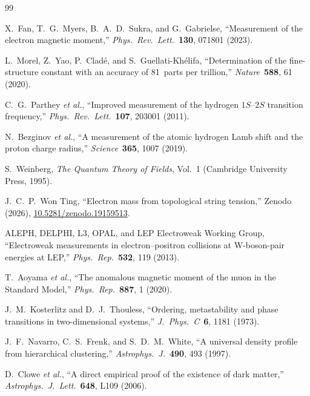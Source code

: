 ﻿\documentclass[a4paper,12pt]{article}
\begin{document}
\begin{thebibliography}{99}

  X.~Fan, T.~G.~Myers, B.~A.~D.~Sukra, and G.~Gabrielse,
  ``Measurement of the electron magnetic moment,''
  \emph{Phys.\ Rev.\ Lett.}\ \textbf{130}, 071801 (2023).

  L.~Morel, Z.~Yao, P.~Clad\'e, and S.~Guellati-Kh\'elifa,
  ``Determination of the fine-structure constant with an accuracy of
  81~parts per trillion,''
  \emph{Nature}\ \textbf{588}, 61 (2020).

  C.~G.~Parthey \emph{et al.},
  ``Improved measurement of the hydrogen $1S$--$2S$ transition
  frequency,''
  \emph{Phys.\ Rev.\ Lett.}\ \textbf{107}, 203001 (2011).

  N.~Bezginov \emph{et al.},
  ``A measurement of the atomic hydrogen Lamb shift and the proton
  charge radius,''
  \emph{Science}\ \textbf{365}, 1007 (2019).

  S.~Weinberg,
  \emph{The Quantum Theory of Fields}, Vol.~1
  (Cambridge University Press, 1995).

  J.~C.~P.~Won Ting,
  ``Electron mass from topological string tension,''
  Zenodo (2026), \href{https://doi.org/10.5281/zenodo.19159513}{10.5281/zenodo.19159513}.

  ALEPH, DELPHI, L3, OPAL, and LEP Electroweak Working Group,
  ``Electroweak measurements in electron--positron collisions at
  W-boson-pair energies at LEP,''
  \emph{Phys.\ Rep.}\ \textbf{532}, 119 (2013).

  T.~Aoyama \emph{et al.},
  ``The anomalous magnetic moment of the muon in the Standard Model,''
  \emph{Phys.\ Rep.}\ \textbf{887}, 1 (2020).

  J.~M.~Kosterlitz and D.~J.~Thouless,
  ``Ordering, metastability and phase transitions in two-dimensional
  systems,''
  \emph{J.\ Phys.\ C}\ \textbf{6}, 1181 (1973).

  J.~F.~Navarro, C.~S.~Frenk, and S.~D.~M.~White,
  ``A universal density profile from hierarchical clustering,''
  \emph{Astrophys.\ J.}\ \textbf{490}, 493 (1997).

  D.~Clowe \emph{et al.},
  ``A direct empirical proof of the existence of dark matter,''
  \emph{Astrophys.\ J.\ Lett.}\ \textbf{648}, L109 (2006).


\end{thebibliography}
\end{document}
